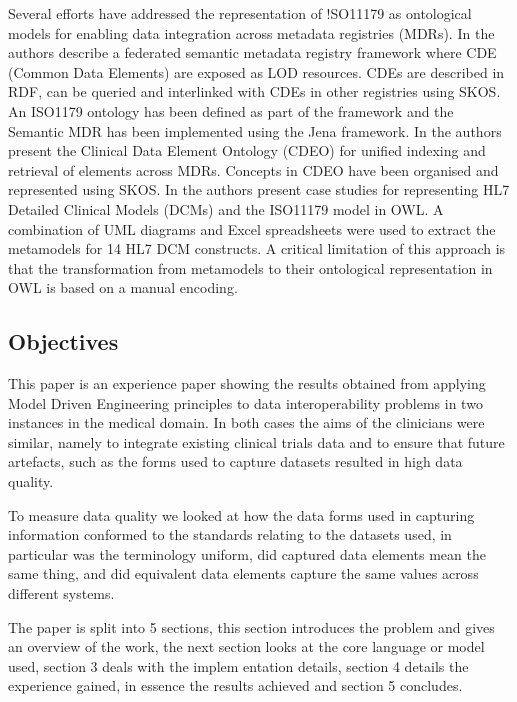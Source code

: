 


Several efforts have addressed the representation of !SO11179 as
ontological models for enabling data integration across metadata
registries (MDRs). In \cite{Sinaci2013784} the authors describe a
federated semantic metadata registry framework where CDE (Common Data
Elements) are exposed as LOD resources. CDEs are described in RDF, can
be queried and interlinked with CDEs in other registries using
SKOS. An ISO1179 ontology has been defined as part of the framework
and the Semantic MDR has been implemented using the Jena framework. In
\cite{pmid25405066} the authors present the Clinical Data Element
Ontology (CDEO) for unified indexing and retrieval of elements across
MDRs. Concepts in CDEO have been organised and represented using
SKOS. In \cite{pmid22211181} the authors present case studies for
representing HL7 Detailed Clinical Models (DCMs) and the ISO11179
model in OWL. A combination of UML diagrams and Excel spreadsheets
were used to extract the metamodels for 14 HL7 DCM constructs. A
critical limitation of this approach is that the transformation from
metamodels to their ontological representation in OWL is based on a
manual encoding.



\subsection{Objectives}
This paper is an experience paper showing the results obtained from applying Model Driven Engineering principles to data interoperability problems in two instances in the medical domain. In both cases the aims of the clinicians were similar, namely to integrate existing clinical trials data and to ensure that future artefacts, such as the forms used to capture datasets resulted in high data quality. 

To measure data quality we looked at how the data forms used in capturing information conformed to the standards relating to the datasets used, in particular was the terminology uniform, did captured data elements mean the same thing, and did equivalent data elements capture the same values across different systems.


The paper is split into 5 sections, this section introduces the problem and gives an overview of the work, the next section looks at the core language or model used, section 3 deals with the implem   entation details, section 4 details the experience gained, in essence the results achieved and section 5 concludes.
